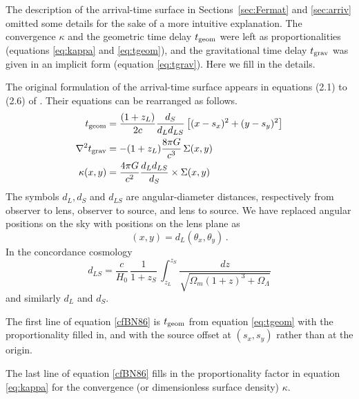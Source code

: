 \documentclass[usenatbib]{mn2e}
\begin{document}
The description of the arrival-time surface in
Sections~\ref{sec:Fermat} and \ref{sec:arriv} omitted some details for
the sake of a more intuitive explanation.  The convergence $\kappa$
and the geometric time delay $t_{\rm geom}$ were left as
proportionalities (equations \ref{eq:kappa} and \ref{eq:tgeom}), and
the gravitational time delay $t_{\rm grav}$ was given in an implicit
form (equation \ref{eq:tgrav}).  Here we fill in the details.

The original formulation of the arrival-time surface appears in
equations (2.1) to (2.6) of \cite{1986ApJ...310..568B}.  Their
equations can be rearranged as follows.
\begin{equation} \label{cfBN86}
\begin{aligned}
t_{\rm geom} &= \frac{(1+z_L)}{2c} \frac{d_S}{d_L d_{LS}}
\left[ (x-s_x)^2 + (y-s_y)^2 \right] \\
\nabla^2 t_{\rm grav} &= -(1+z_L)\frac{8\pi G}{c^3} \, \Sigma(x,y) \\
\kappa(x,y) &= \frac{4\pi G}{c^2} \frac{d_L d_{LS}}{d_S}
               \times \Sigma(x,y)
\end{aligned}
\end{equation}
The symbols $d_L,d_S$ and $d_{LS}$ are angular-diameter distances,
respectively from observer to lens, observer to source, and lens to
source. We have replaced angular positions on the sky with positions
on the lens plane as
\begin{equation}
(x,y) = d_L (\theta_x,\theta_y) \,.
\end{equation}
In the concordance cosmology
\begin{equation}
d_{LS} = \frac{c}{H_0}\,\frac1{1+z_S} \,
\int_{z_L}^{z_S} \!\! \frac{dz}{\sqrt{\Omega_m(1+z)^3 + \Omega_\Lambda}}
\end{equation}
and similarly $d_L$ and $d_S$.

The first line of equation \eqref{cfBN86} is $t_{\rm geom}$ from
equation \eqref{eq:tgeom} with the proportionality filled in, and with
the source offset at $(s_x,s_y)$ rather than at the origin.

The last line of equation \eqref{cfBN86} fills in the proportionality
factor in equation \eqref{eq:kappa} for the convergence (or
dimensionless surface density) $\kappa$.
\end{document}
